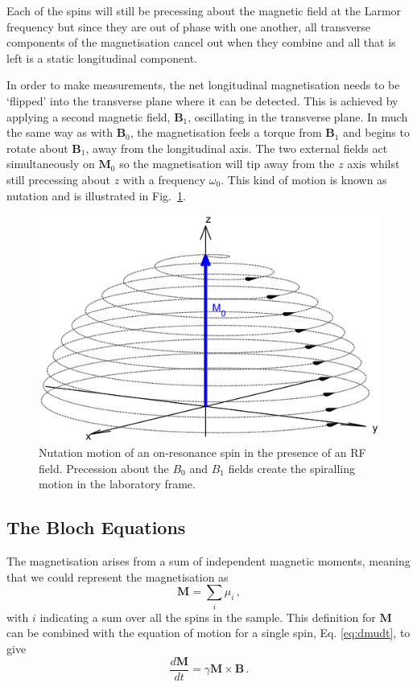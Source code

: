 Each of the spins will still be precessing about the magnetic field at the Larmor frequency but since they are out of phase with one another, all transverse components of the magnetisation cancel out when they combine and all that is left is a static longitudinal component. 


In order to make measurements, the net longitudinal magnetisation needs to be `flipped' into the transverse plane where it can be detected. 
This is achieved by applying a second magnetic field, $\mathbf{B}_1$, oscillating in the transverse plane. 
In much the same way as with $\mathbf{B}_0$, the magnetisation feels a torque from $\mathbf{B}_1$ and begins to rotate about $\mathbf{B}_1$, away from the longitudinal axis.
The two external fields act simultaneously on $\mathbf{M}_0$ so the magnetisation will tip away from the $z$ axis whilst still precessing about $z$ with a frequency $\omega_0$.
This kind of motion is known as nutation and is illustrated in Fig.\ \ref{fig:nutation}.  

\begin{figure}
	\centering
	\includegraphics[width=\textwidth]{figures/background/nutation.eps}
	\caption{Nutation motion of an on-resonance spin in the presence of an \ac{RF} field. Precession about the $B_0$ and $B_1$ fields create the spiralling motion in the laboratory frame.}
	\label{fig:nutation}
\end{figure}



\subsection{The Bloch Equations}
\label{sec:bg_bloch}
The magnetisation arises from a sum of independent magnetic moments, meaning that we could represent the magnetisation as 
\begin{equation}
	\mathbf{M} = \sum_i \mu_i \,,
\end{equation}
with $i$ indicating a sum over all the spins in the sample.
This definition for $\mathbf{M}$ can be combined with the equation of motion for a single spin, Eq. \ref{eq:dmudt}, to give \cite{Haacke1999}
\begin{equation}
	\frac{d\mathbf{M}}{dt} = \gamma \mathbf{M} \times \mathbf{B}\,.
	\label{eq:dMdt}
\end{equation}  

